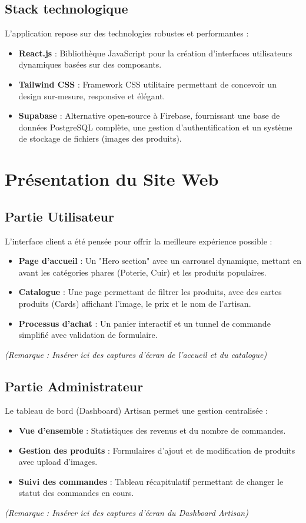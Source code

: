 \documentclass[12pt,a4paper]{report}
\begin{document}
\subsection{Stack technologique}
L'application repose sur des technologies robustes et performantes :
\begin{itemize}
    \item \textbf{React.js} : Bibliothèque JavaScript pour la création d'interfaces utilisateurs dynamiques basées sur des composants.
    \item \textbf{Tailwind CSS} : Framework CSS utilitaire permettant de concevoir un design sur-mesure, responsive et élégant.
    \item \textbf{Supabase} : Alternative open-source à Firebase, fournissant une base de données PostgreSQL complète, une gestion d'authentification et un système de stockage de fichiers (images des produits).
\end{itemize}

\section{Présentation du Site Web}

\subsection{Partie Utilisateur}
L'interface client a été pensée pour offrir la meilleure expérience possible :
\begin{itemize}
    \item \textbf{Page d'accueil} : Un "Hero section" avec un carrousel dynamique, mettant en avant les catégories phares (Poterie, Cuir) et les produits populaires.
    \item \textbf{Catalogue} : Une page permettant de filtrer les produits, avec des cartes produits (Cards) affichant l'image, le prix et le nom de l'artisan.
    \item \textbf{Processus d'achat} : Un panier interactif et un tunnel de commande simplifié avec validation de formulaire.
\end{itemize}
\textit{(Remarque : Insérer ici des captures d'écran de l'accueil et du catalogue)}

\subsection{Partie Administrateur}
Le tableau de bord (Dashboard) Artisan permet une gestion centralisée :
\begin{itemize}
    \item \textbf{Vue d'ensemble} : Statistiques des revenus et du nombre de commandes.
    \item \textbf{Gestion des produits} : Formulaires d'ajout et de modification de produits avec upload d'images.
    \item \textbf{Suivi des commandes} : Tableau récapitulatif permettant de changer le statut des commandes en cours.
\end{itemize}
\textit{(Remarque : Insérer ici des captures d'écran du Dashboard Artisan)}
\end{document}
